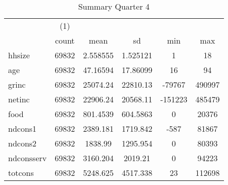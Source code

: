 \begin{table}[htbp]\centering
\def\sym#1{\ifmmode^{#1}\else\(^{#1}\)\fi}
\caption{Summary Quarter 4 \label{sum\_Q4}}
\begin{tabular}{l*{1}{ccccc}}
\hline\hline
            &\multicolumn{1}{c}{(1)}&            &            &            &            \\
            &       count&        mean&          sd&         min&         max\\
\hline
hhsize      &       69832&    2.558555&    1.525121&           1&          18\\
age         &       69832&    47.16594&    17.86099&          16&          94\\
grinc       &       69832&    25074.24&    22810.13&      -79767&      490997\\
netinc      &       69832&    22906.24&    20568.11&     -151223&      485479\\
food        &       69832&    801.4539&    604.5863&           0&       20376\\
ndcons1     &       69832&    2389.181&    1719.842&        -587&       81867\\
ndcons2     &       69832&     1838.99&    1295.954&           0&       80393\\
ndconsserv  &       69832&    3160.204&     2019.21&           0&       94223\\
totcons     &       69832&    5248.625&    4517.338&          23&      112698\\
\hline\hline
\end{tabular}
\end{table}
